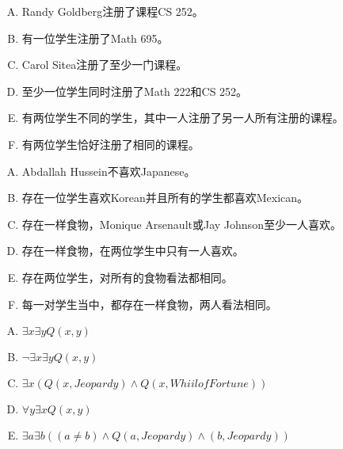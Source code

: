 {{        %
        \begin{practices}
            \begin{enumerate}[A.]
                \item Randy Goldberg注册了课程CS 252。
                \item 有一位学生注册了Math 695。
                \item Carol Sitea注册了至少一门课程。
                \item 至少一位学生同时注册了Math 222和CS 252。
                \item 有两位学生不同的学生，其中一人注册了另一人所有注册的课程。
                \item 有两位学生恰好注册了相同的课程。
            \end{enumerate}
        \end{practices}

        \begin{practices}
            \begin{enumerate}[A.]
                \item Abdallah Hussein不喜欢Japanese。
                \item 存在一位学生喜欢Korean并且所有的学生都喜欢Mexican。
                \item 存在一样食物，Monique Arsenault或Jay Johnson至少一人喜欢。
                \item 存在一样食物，在两位学生中只有一人喜欢。
                \item 存在两位学生，对所有的食物看法都相同。
                \item 每一对学生当中，都存在一样食物，两人看法相同。
            \end{enumerate}
        \end{practices}

        \begin{practices}
            \begin{enumerate}[A.]
                \item $\exists x \exists y Q(x, y)$
                \item $\neg \exists x \exists y Q(x, y)$
                \item $\exists x (Q(x, Jeopardy) \wedge Q(x, Whiil of Fortune))$
                \item $\forall y \exists x Q(x, y)$
                \item $\exists a \exists b ((a \neq b) \wedge Q(a, Jeopardy) \wedge (b, Jeopardy))$
            \end{enumerate}
        \end{practices}

}}
